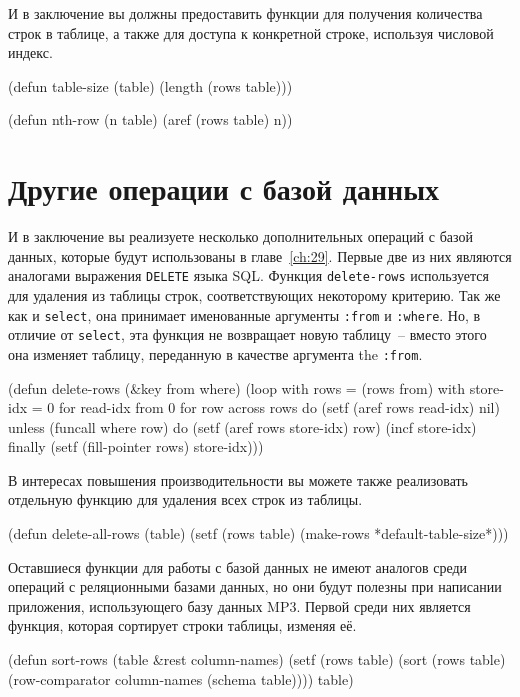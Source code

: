 И в заключение вы должны предоставить функции для получения количества строк в таблице, а
также для доступа к конкретной строке, используя числовой индекс.

\begin{myverb}
(defun table-size (table)
  (length (rows table)))

(defun nth-row (n table)
  (aref (rows table) n))
\end{myverb}

\section{Другие операции с базой данных}

И в заключение вы реализуете несколько дополнительных операций с базой данных, которые
будут использованы в главе~\ref{ch:29}.  Первые две из них являются аналогами выражения
\lstinline{DELETE} языка SQL.  Функция \lstinline{delete-rows} используется для удаления из таблицы
строк, соответствующих некоторому критерию.  Так же как и \lstinline{select}, она принимает
именованные аргументы \lstinline{:from} и \lstinline{:where}.  Но, в отличие от \lstinline{select}, эта
функция не возвращает новую таблицу~-- вместо этого она изменяет таблицу, переданную в
качестве аргумента the \lstinline{:from}.

\begin{myverb}
(defun delete-rows (&key from where)
  (loop
     with rows = (rows from)
     with store-idx = 0
     for read-idx from 0
     for row across rows
     do (setf (aref rows read-idx) nil)
     unless (funcall where row) do
       (setf (aref rows store-idx) row)
       (incf store-idx)
     finally (setf (fill-pointer rows) store-idx)))
\end{myverb}

В интересах повышения производительности вы можете также реализовать отдельную функцию
для удаления всех строк из таблицы.

\begin{myverb}
(defun delete-all-rows (table)
  (setf (rows table) (make-rows *default-table-size*)))
\end{myverb}

Оставшиеся функции для работы с базой данных не имеют аналогов среди операций с
реляционными базами данных, но они будут полезны при написании приложения, использующего
базу данных MP3.  Первой среди них является функция, которая сортирует строки таблицы,
изменяя её.

\begin{myverb}
(defun sort-rows (table &rest column-names)
  (setf (rows table) (sort (rows table) (row-comparator column-names (schema table))))
  table)
\end{myverb}

